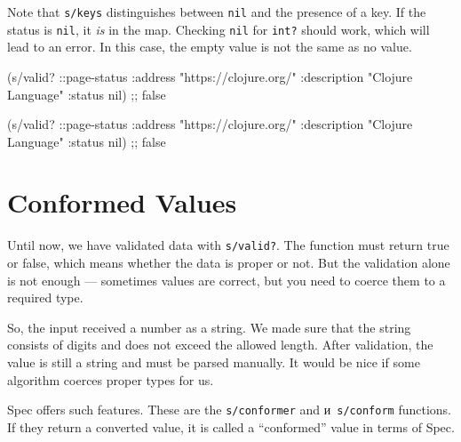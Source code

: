 \fi


Note that \verb|s/keys| distinguishes between \verb|nil| and the presence of a key. If the status is \verb|nil|, it \emph{is} in the map. Checking \verb|nil| for \verb|int?| should work, which will lead to an error. In this case, the empty value is not the same as no value.

\ifx\DEVICETYPE\MOBILE

\begin{english}
  \begin{clojure}
(s/valid? ::page-status
  {:address "https://clojure.org/"
   :description "Clojure Language"
   :status nil})
;; false
  \end{clojure}
\end{english}

\else

\begin{english}
  \begin{clojure}
(s/valid? ::page-status
          {:address "https://clojure.org/"
           :description "Clojure Language"
           :status nil})
;; false
  \end{clojure}
\end{english}

\fi

\section{Conformed Values}

\label{spec-conform}


Until now, we have validated data with \verb|s/valid?|. The function must return true or false, which means whether the data is proper or not. But the validation alone is not enough — sometimes values are correct, but you need to coerce them to a required type.

So, the input received a number as a string. We made sure that the string consists of digits and does not exceed the allowed length. After validation, the value is still a string and must be parsed manually. It would be nice if some algorithm coerces proper types for us.


Spec offers such features. These are the \verb|s/conformer| and и~\verb|s/conform| functions. If they return a converted value, it is called a ``conformed'' value in terms of Spec.


